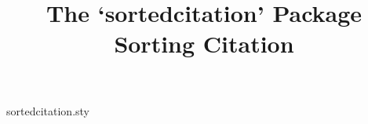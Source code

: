 \begin{filecontents}{sortedcitation.sty}
\newenvironment{sbibliography}{%
\section *{\hypertarget{refpage}{\refname}}
\parindent=0em}
{%
\ifnum\value{citenum}>0{
\setcounter{tmp}{0}%
	\loop
		\stepcounter{tmp}
		[\csname citeentries\thetmp.seqno\endcsname]\,\csname citeentries\thetmp.ref\endcsname \\
	\ifnum \value{tmp}<\value{citenum} \repeat
	}\fi
\ifnum\value{bibnum}>0{%
\setcounter{tmp}{0}
	\loop
		\stepcounter{tmp}
		[\csname bibentries\thetmp.seqno\endcsname]\,\csname bibentries\thetmp.ref\endcsname \\
	\ifnum \value{tmp}<\value{bibnum} \repeat
	}\fi
}

\end{filecontents}

\documentclass[a4paper]{article}
\usepackage{fontspec}
\setmainfont{Rockwell} %
\usepackage{hyperref}

\usepackage{fancyvrb-ex}
\usepackage{sortedcitation}

\usepackage{tcolorbox}

\linespread{1.5}
\title{The `sortedcitation' Package \\ Sorting Citation}

\maketitle
Package sortedcitation provides 3 commands to sort the bibliography at the end of the article.

\textbackslash scite\{biblabel\}: similar to \textbackslash cite\{biblabel\}.

\textbackslash sbibitem\{biblabel\}\{the reference content\}: It is DIFFERENT from \\ . For the reference content is served as the second option.

\textbackslash begin{sbibliography}...\textbackslash end\{sbibliography\} has NO option, comparing to \textbackslash begin\{thebibliography\}\{30\}...\textbackslash end\{thebibliography\}.

The following is the example.
\vspace{30pt}

